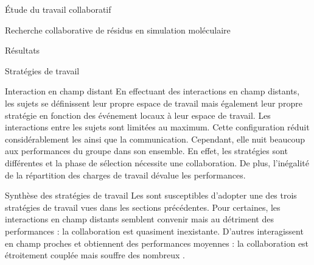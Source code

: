 \documentclass[myfrancais]{mythesis}
\begin{document}
\begin{mypart}{Étude du travail collaboratif}
\begin{mychapter}{Recherche collaborative de résidus en simulation moléculaire}
\begin{mysection}{Résultats}
\begin{mysubsection}{Stratégies de travail}
\begin{mysubsubsection}{Interaction en champ distant}
						En effectuant des interactions en champ distants, les sujets se définissent leur propre espace de travail mais également leur propre stratégie en fonction des événement locaux à leur espace de travail.
						Les interactions entre les sujets sont limitées au maximum.
						Cette configuration réduit considérablement les  ainsi que la communication.
						Cependant, elle nuit beaucoup aux performances du groupe dans son ensemble.
						En effet, les stratégies sont différentes et la phase de sélection nécessite une collaboration.
						De plus, l'inégalité de la répartition des charges de travail dévalue les performances.
					\end{mysubsubsection}
					\begin{mysubsubsection}{Synthèse des stratégies de travail}
						Les  sont susceptibles d'adopter une des trois stratégies de travail vues dans les sections précédentes.
						Pour certaines, les interactions en champ distants semblent convenir mais au détriment des performances : la collaboration est quasiment inexistante.
						D'autres  interagissent en champ proches et obtiennent des performances moyennes : la collaboration est étroitement couplée mais souffre des nombreux .


\end{mysubsubsection}
\end{mysubsection}
\end{mysection}
\end{mychapter}
\end{mypart}
\end{document}
